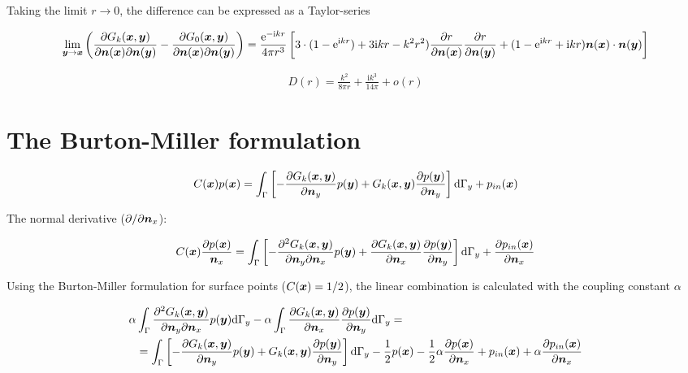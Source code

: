 \documentclass[a4paper, 10pt]{article}
\newcommand{\te}{\mathrm{e}}
\newcommand{\ti}{\mathrm{i}}
\newcommand{\td}{\mathrm{d}}
\newcommand{\tn}{\bm{\mathnormal{n}}}
\newcommand{\tx}{\bm{\mathnormal{x}}}
\newcommand{\ty}{\bm{\mathnormal{y}}}
\newcommand{\sx}{\bm{\mathnormal{x}}}
\newcommand{\sy}{\bm{\mathnormal{y}}}
\newcommand{\sn}{\bm{\mathnormal{n}}}
\begin{document}
Taking the limit $r \rightarrow 0$, the difference can be expressed as a Taylor-series

\begin{align}
	\lim\limits_{\sy \rightarrow \sx} \left(\frac{\partial G_k(\tx, \ty)}{\partial \tn(\tx) \partial \tn(\ty)} - \frac{\partial G_0(\tx, \ty)}{\partial \tn(\tx) \partial \tn(\ty)}\right) = 
	\frac{\te^{- \ti kr}}{4 \pi r^3}\left[3 \cdot (1 - \te^{\ti kr}) + 3 \ti kr - k^2 r^2) \frac{\partial r}{\partial \tn(\tx)}\frac{\partial r}{\partial \tn(\ty)} + (1 - \te^{\ti kr} + \ti kr) \tn(\tx) \cdot \tn (\ty) \right]
\end{align}

\begin{align}
	D(r) = \frac{k^2}{8 \pi r} + \frac{\ti k^3}{14 \pi} + o(r)
\end{align}



\section{The Burton-Miller formulation}

\begin{equation}
	C(\sx) p (\sx) = \int_{\Gamma}\left[-\frac{\partial{G}_k (\sx, \sy)}{\partial \sn_y} p(\sy) + G_k(\sx,\sy)\frac{\partial p(\sy)}{\partial \sn_y}\right] \td \Gamma_y + p_{in}(\sx)
\end{equation}

The normal derivative ($ \partial / \partial \sn_x$):

\begin{equation}
	C(\sx) \frac{\partial p(\sx)}{\sn_x} = \int_{\Gamma}\left[-\frac{\partial^2{G}_k (\sx, \sy)}{\partial \sn_y \partial \sn_x} p(\sy) + \frac{\partial G_k(\sx,\sy)}{\partial \sn_x}\frac{\partial p(\sy)}{\partial \sn_y}\right] \td \Gamma_y + \frac{\partial p_{in}(\sx)}{\partial \sn_x}
\end{equation}

Using the Burton-Miller formulation for surface points ($C(\sx) = 1/2$), the linear combination is calculated with the coupling constant $\alpha$

\begin{align}
	\alpha & \int_\Gamma \frac{\partial^2{G}_k (\sx, \sy)}{\partial \sn_y \partial \sn_x} p(\sy) \td \Gamma_y -
	\alpha \int_\Gamma \frac{\partial{G}_k (\sx, \sy)}{\partial \sn_x} \frac{\partial p(\sy)}{\partial \sn_y} \td \Gamma_y = \nonumber \\
	& = \int_{\Gamma}\left[-\frac{\partial{G}_k (\sx, \sy)}{\partial \sn_y} p(\sy) + G_k(\sx,\sy)\frac{\partial p(\sy)}{\partial \sn_y}\right] \td \Gamma_y - \frac{1}{2} p(\sx) - \frac{1}{2}\alpha \frac{ \partial p(\sx)}{\partial \sn_x} + p_{in}(\sx) + \alpha \frac{\partial p_{in}(\sx)}{\partial \sn_x}
\end{align}
\end{document}
